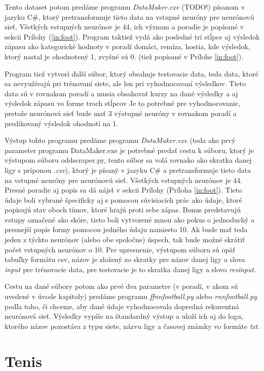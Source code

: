 Tento dataset potom predáme programu \textit{DataMaker.exe} (TODO!) písanom v jazyku C\#, ktorý pretransformuje tieto data na vstupné neuróny pre neurónovú sieť. Všetkých vstupných neurónov je 44, ich význam a poradie je popísané v sekcii Prílohy (\ref{in:foot}). Program taktiež vydá ako posledné tri stĺpce aj výsledok zápasu ako kategorické hodnoty v poradí domáci, remíza, hostia, kde výsledok, ktorý nastal je ohodnotený 1, zvyšné sú 0. (tiež popísané v Prílohe \ref{in:foot}).

Program tiež vytvorí ďalší súbor, ktorý obsahuje testovacie data, teda data, ktoré sa nevyužívajú pri trénovaní siete, ale len pri vyhodnocovaní výsledkov. 
Tieto data sú v rovnakom poradí a musia obsahovať kurzy na dané výsledky a aj výsledok zápasu vo forme troch stĺpcov 
Je to potrebné pre vyhodnocovanie, pretože neurónová sieť bude mať 3 výstupné neuróny v rovnakom poradí a predikovaný výsledok ohodnotí na 1.

Výstup tohto programu predáme programu \textit{DataMaker.exe} (teda ako prvý parameter programu DataMaker.exe je potrebné predať cestu k súboru, ktorý je výstupom súboru oddscraper.py, tento súbor sa volá rovnako ako skratka danej ligy s príponou \textit{.csv}), ktorý je písaný v jazyku C\# a pretransformuje tieto data na vstupné neuróny pre neurónovú sieť. 
Všetkých vstupných neurónov je 44. 
Presné poradie aj popis sa dá nájsť v sekcii Prílohy (Príloha \ref{in:foot}).
Tieto údaje boli vybrané špecificky aj s pomocou súvisiacich prác ako údaje, ktoré popisujú stav oboch tímov, ktoré hrajú proti sebe zápas. 
Bonus predstavujú vstupy označené ako skóre, tieto boli vytvorené mnou ako pokus o jednoduchý a presnejší popis formy pomocou jedného údaju namiesto 10.
Ak bude mať teda jeden z týchto neurónov (alebo obe spoločne) úspech, tak bude možné skrátiť počet vstupných neurónov o 10.
Pre upresnenie, výstupom súboru sú opäť tabuľky formátu csv, názov je zložený zo skratky pre názov danej ligy a slova \textit{input} pre trénovacie data, pre testovacie je to skratka danej ligy a slovo \textit{resinput}.

Cestu na dané súbory potom ako prvé dva parametre (v poradí, v akom sú uvedené v úvode kapitoly) predáme programu \textit{ffnnfootball.py} alebo \textit{rnnfootball.py} podľa toho, či chceme, aby dané údaje vyhodnocovala dopredná rekurentná neurónová sieť.
Výsledky vypíše na štandardný výstup a uloží ich aj do logu, ktorého názov pozostáva z typu siete, názvu ligy a časovej známky vo formáte \textit{txt}.

\section{Tenis}

